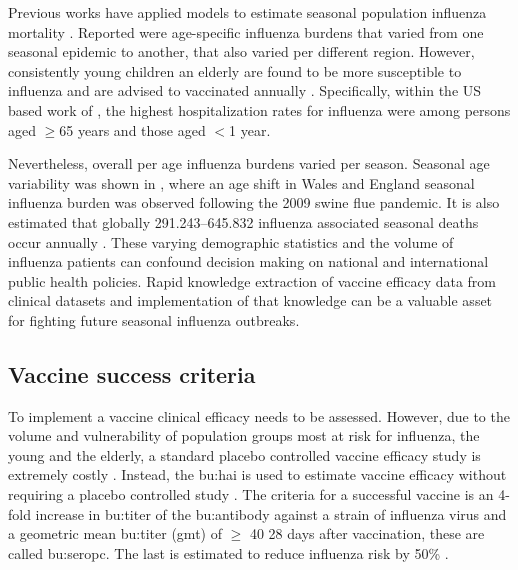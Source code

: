 Previous works have applied models to estimate seasonal population influenza mortality \citep{zhouHospitalizationsAssociatedInfluenza2012, greenMortalityAttributableInfluenza2013, iulianoEstimatesGlobalSeasonal2018}.
Reported were age-specific influenza burdens that varied from one seasonal epidemic to another, that also varied per different region.
However, consistently young children an elderly are found to be more susceptible to influenza and are advised to vaccinated annually \citep{zhouHospitalizationsAssociatedInfluenza2012}.  Specifically, within the US based work of \cite{zhouHospitalizationsAssociatedInfluenza2012}, the highest hospitalization rates for influenza were among persons aged $\geq$65 years and those aged $<$1 year.

Nevertheless, overall per age influenza burdens varied per season.
Seasonal age variability was shown in \cite{greenMortalityAttributableInfluenza2013}, where an age shift in Wales and England seasonal influenza burden was observed following the 2009 swine flue pandemic.
It is also estimated that globally 291.243–645.832 influenza associated seasonal deaths occur annually \citep{iulianoEstimatesGlobalSeasonal2018}.
These varying demographic statistics and the volume of influenza patients can confound decision making on national and international public health policies.
Rapid knowledge extraction of vaccine efficacy data from clinical datasets and implementation of that knowledge can be a valuable asset for fighting future seasonal influenza outbreaks.

\subsection{Vaccine success criteria}

To implement a vaccine clinical efficacy needs to be assessed.
However, due to the volume and vulnerability of population groups most at risk for influenza, the young and the elderly, a standard placebo controlled vaccine efficacy study is extremely costly \citep{zhouHospitalizationsAssociatedInfluenza2012}.
Instead, the \gls{bu:hai} is used to estimate vaccine efficacy without requiring a placebo controlled study \citep{dejongHaemagglutinationinhibitingAntibodyInfluenza2003}.
The criteria for a successful vaccine is an 4-fold increase in \gls{bu:titer} of the \gls{bu:antibody} against a strain of influenza virus and a geometric mean \gls{bu:titer} (\acrshort{gmt}) of $\geq$ 40 28 days after vaccination, these are called \gls{bu:seropc}.
The last is estimated to reduce influenza risk by 50\% \citep{dejongHaemagglutinationinhibitingAntibodyInfluenza2003}.

